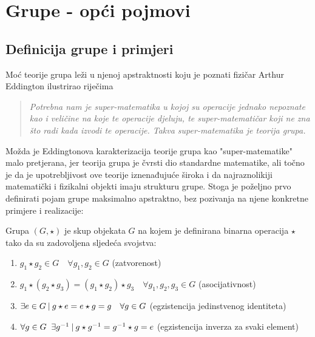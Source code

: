 
\chapter{Grupe - opći pojmovi}

\section{Definicija grupe i primjeri}


Moć teorije grupa leži u njenoj apstraktnosti koju je poznati fizičar Arthur
Eddington ilustrirao 
riječima
\begin{quote}
\emph{Potrebna nam je super-matematika u kojoj su operacije jednako nepoznate kao i
veličine na koje te operacije djeluju, te super-matematičar koji ne zna što radi kada
izvodi te operacije. Takva super-matematika je teorija grupa.}
\end{quote}
Možda je Eddingtonova karakterizacija teorije grupa kao "super-matematike" malo pretjerana, jer
teorija grupa je čvrsti dio standardne matematike, ali točno je da je upotrebljivost
ove teorije iznenađujuće široka i da najraznolikiji matematički i fizikalni objekti
imaju strukturu grupe.
Stoga je poželjno prvo definirati pojam grupe maksimalno apstraktno, bez pozivanja
na njene konkretne primjere i realizacije:

\begin{definicija}[Grupa] 
Grupa $(G,\star)$ je skup objekata $G$ na kojem je definirana binarna operacija
 $\star$ tako da su zadovoljena sljedeća svojstva:
\begin{enumerate}
\item $g_1 \star g_2 \in G \quad \forall  g_1, g_2 \in G$  (zatvorenost)
\item $ g_1 \star (g_2 \star g_3) = (g_1 \star  g_2)\star g_3 \quad \forall 
    g_1, g_2, g_3 \in G$  (asocijativnost)
\item $\exists e \in G \: | \: g\star e = e \star g = g \quad \forall g\in G$
    (egzistencija jedinstvenog identiteta)
\item $\forall g\in G \;\; \exists g^{-1} \: | \: g\star g^{-1} = g^{-1}\star g =e$
    (egzistencija inverza za svaki element)
\end{enumerate}
\end{definicija}

